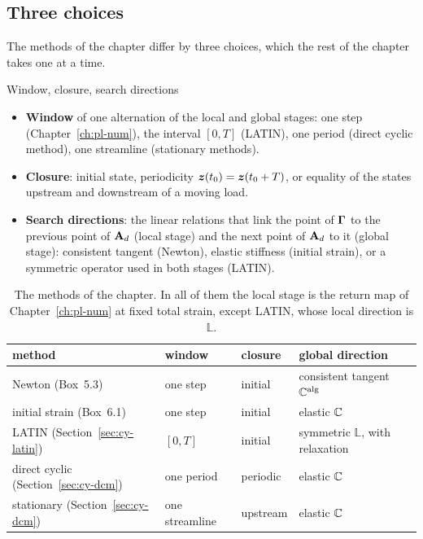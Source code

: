 \subsection{Three choices}
The methods of the chapter differ by three choices, which the rest of the
chapter takes one at a time.
\begin{gbox}{Window, closure, search directions}
%
\begin{itemize}
  \item \textbf{Window} of one alternation of the local and global stages: one
  step (Chapter~\ref{ch:pl-num}), the interval $[0,T]$ (LATIN), one period
  (direct cyclic method), one streamline (stationary methods).
  \item \textbf{Closure}: initial state, periodicity $\bm{z}(t_0)=\bm{z}(t_0+T)$, or
  equality of the states upstream and downstream of a moving load.
  \item \textbf{Search directions}: the linear relations that link the point
  of $\boldsymbol{\Gamma}$ to the previous point of $\mathbf{A}_{d}$ (local stage) and the next point of
  $\mathbf{A}_{d}$ to it (global stage): consistent tangent (Newton), elastic stiffness
  (initial strain), or a symmetric operator used in both stages (LATIN).
\end{itemize}
\end{gbox}

\begin{table}[h]
\centering\small
\renewcommand{\arraystretch}{1.15}
\begin{tabular}{@{}llll@{}}
\toprule
\sffamily method & \sffamily window & \sffamily closure & \sffamily global direction\\
\midrule
Newton (Box~5.3) & one step & initial & consistent tangent $\mathbb{C}^{\mathrm{alg}}$\\
initial strain (Box~6.1) & one step & initial & elastic $\mathbb{C}$\\
LATIN (Section~\ref{sec:cy-latin}) & $[0,T]$ & initial & symmetric $\mathbb L$, with relaxation\\
direct cyclic (Section~\ref{sec:cy-dcm}) & one period & periodic & elastic $\mathbb{C}$\\
stationary (Section~\ref{sec:cy-dcm}) & one streamline & upstream & elastic $\mathbb{C}$\\
\bottomrule
\end{tabular}
\caption{The methods of the chapter. In all of them the local stage is the
return map of Chapter~\ref{ch:pl-num} at fixed total strain, except LATIN,
whose local direction is $\mathbb L$.}
\label{tab:cy-methods}
\end{table}

